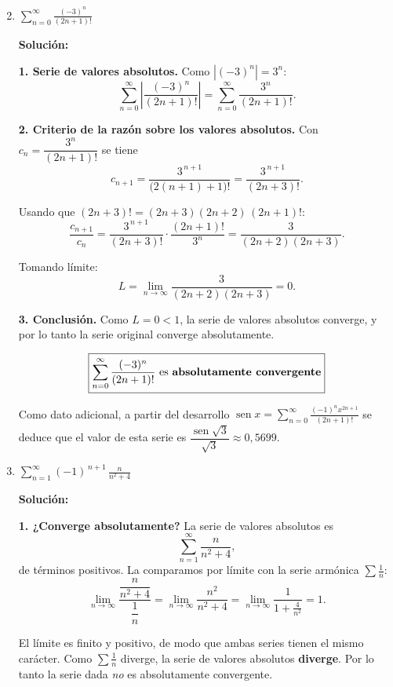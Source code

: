 \documentclass[12pt]{article}
\newcommand{\solucion}{%
    \vspace{0.8em}%
    \textbf{Solución:}%
}
\begin{document}
\begin{enumerate}[label=\alph*.-]

    \setcounter{enumi}{1} %

    \item $\displaystyle\sum_{n=0}^{\infty}\frac{(-3)^{n}}{(2n+1)!}$

    \solucion

    \textbf{1. Serie de valores absolutos.} Como $|(-3)^{n}|=3^{n}$:
    \[
    \sum_{n=0}^{\infty}\left|\frac{(-3)^{n}}{(2n+1)!}\right|
    =\sum_{n=0}^{\infty}\frac{3^{n}}{(2n+1)!} .
    \]

    \textbf{2. Criterio de la razón sobre los valores absolutos.} Con
    $c_n=\dfrac{3^{n}}{(2n+1)!}$ se tiene
    \[
    c_{n+1}=\frac{3^{\,n+1}}{\big(2(n+1)+1\big)!}=\frac{3^{\,n+1}}{(2n+3)!} .
    \]

    Usando que $(2n+3)!=(2n+3)(2n+2)\,(2n+1)!$:
    \[
    \frac{c_{n+1}}{c_n}
    =\frac{3^{\,n+1}}{(2n+3)!}\cdot\frac{(2n+1)!}{3^{n}}
    =\frac{3}{(2n+2)(2n+3)} .
    \]

    Tomando límite:
    \[
    L=\lim_{n\to\infty}\frac{3}{(2n+2)(2n+3)}=0 .
    \]

    \textbf{3. Conclusión.} Como $L=0<1$, la serie de valores absolutos
    converge, y por lo tanto la serie original converge absolutamente.

    \[
    \boxed{
    \sum_{n=0}^{\infty}\frac{(-3)^{n}}{(2n+1)!}
    \text{ es \textbf{absolutamente convergente}}
    }
    \]

    Como dato adicional, a partir del desarrollo
    $\operatorname{sen}x=\sum_{n=0}^{\infty}\frac{(-1)^{n}x^{2n+1}}{(2n+1)!}$ se
    deduce que el valor de esta serie es
    $\dfrac{\operatorname{sen}\sqrt3}{\sqrt3}\approx 0{,}5699$.

    \item $\displaystyle\sum_{n=1}^{\infty}(-1)^{\,n+1}\,\frac{n}{n^{2}+4}$

    \solucion

    \textbf{1. ¿Converge absolutamente?} La serie de valores absolutos es
    \[
    \sum_{n=1}^{\infty}\frac{n}{n^{2}+4},
    \]
    de términos positivos. La comparamos por límite con la serie armónica
    $\sum\frac1n$:
    \[
    \lim_{n\to\infty}\frac{\dfrac{n}{n^{2}+4}}{\dfrac1n}
    =\lim_{n\to\infty}\frac{n^{2}}{n^{2}+4}
    =\lim_{n\to\infty}\frac{1}{1+\frac{4}{n^{2}}}
    =1 .
    \]

    El límite es finito y positivo, de modo que ambas series tienen el mismo
    carácter. Como $\sum\frac1n$ diverge, la serie de valores absolutos
    \textbf{diverge}. Por lo tanto la serie dada \emph{no} es absolutamente
    convergente.


\end{enumerate}
\end{document}
